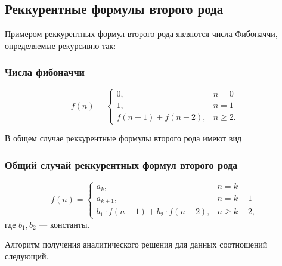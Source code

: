 \subsection{Реккурентные формулы второго рода}

Примером реккурентных формул второго рода являются числа Фибоначчи, определяемые рекурсивно так:
\begin{frame}
    \frametitle{Числа фибоначчи}
    \begin{example}
    \[
        f(n)=
        \begin{cases}
            0,              &n=0\\
            1,              &n=1\\
            f(n-1)+f(n-2),  &n\geq 2.
        \end{cases}
    \]
    \end{example}
\end{frame}

В общем случае реккурентные формулы второго рода имеют вид
\begin{frame}
    \frametitle{Общий случай реккурентных формул второго рода}
    \[
        f(n)=
        \begin{cases}
            a_{k},                          &n=k\\
            a_{k+1},                        &n=k+1\\
            b_1\cdot f(n-1)+b_2\cdot f(n-2),&n\geq k+2,
        \end{cases}
    \]
    где $b_1,b_2$ --- константы.
\end{frame}

Алгоритм получения аналитического решения для данных соотношений следующий.

